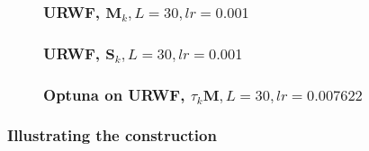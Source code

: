 \documentclass{beamer}
\theoremstyle{definition}
\theoremstyle{remark}
\begin{document}
\begin{frame}
  \begin{figure}
    \frametitle{URWF, $\boldsymbol{M}_k,L=30,lr=0.001$}
    \centering
    \resizebox{0.9\textwidth}{!}{}
    \label{fig:rwf_s_06_l_30_lr_0.001}
  \end{figure}
\end{frame}
\begin{frame}
  \begin{figure}
    \frametitle{URWF, $\boldsymbol{S}_k,L=30,lr=0.001$}
    \centering
    \resizebox{0.9\textwidth}{!}{}
    \label{fig:rwf_s_07_l_30_lr_0.001}
  \end{figure}
\end{frame}
\begin{frame}
  \begin{figure}
    \frametitle{Optuna on URWF, $\tau_k\boldsymbol{M},L=30,lr=0.007622$}
    \centering
    \resizebox{0.9\textwidth}{!}{}
    \label{fig:urwf_optuna}
  \end{figure}
\end{frame}





\begin{frame}
\frametitle{Illustrating the construction}
\end{frame}
\end{document}
